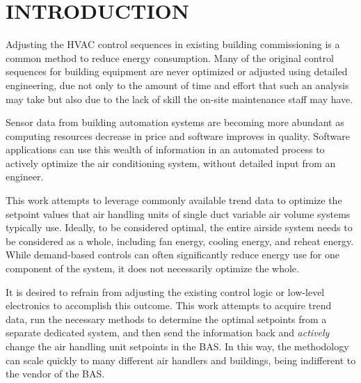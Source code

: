 %
%
%



\pagestyle{plain} %
\setcounter{page}{1}


\chapter{\texorpdfstring{\MakeUppercase{Introduction}}{Introduction}} 
Adjusting the HVAC control sequences in existing building commissioning
is a common method to reduce energy consumption. Many of the original
control sequences for building equipment are never optimized or adjusted
using detailed engineering, due not only to the amount of time and
effort that such an analysis may take but also due to the lack of skill
the on-site maintenance staff may have. 

Sensor data from building automation systems are becoming more abundant
as computing resources decrease in price and software improves in
quality.  Software applications can use this wealth of information in an
automated process to actively optimize the air conditioning system,
without detailed input from an engineer. 

This work attempts to leverage commonly available trend data to optimize the
setpoint values that air handling units of single duct variable air volume
systems typically use. Ideally, to be considered optimal, the entire airside
system needs to be considered as a whole, including fan energy, cooling energy,
and reheat energy. While demand-based controls can often significantly reduce
energy use for one component of the system, it does not necessarily optimize
the whole. 

It is desired to refrain from adjusting the existing control logic or low-level
electronics to accomplish this outcome. This work attempts to acquire trend
data, run the necessary methods to determine the optimal setpoints from a
separate dedicated system, and then send the information back and
\textit{actively} change the air handling unit setpoints in the BAS. In this
way, the methodology can scale quickly to many different air handlers and
buildings, being indifferent to the vendor of the BAS.
